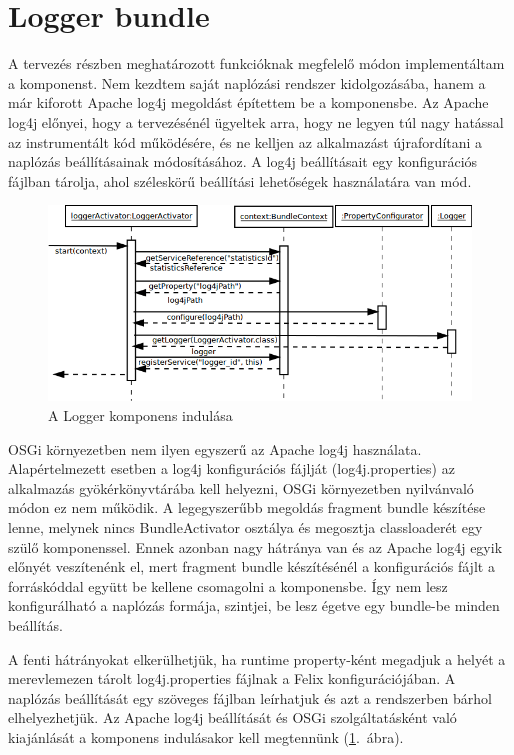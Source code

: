 
\section{Logger bundle}
\label{sec:loggerbundle}

A tervezés részben meghatározott funkcióknak megfelelő módon implementáltam a komponenst. Nem kezdtem saját naplózási rendszer kidolgozásába, hanem a már kiforott Apache log4j megoldást építettem be a komponensbe. Az Apache log4j előnyei, hogy a tervezésénél ügyeltek arra, hogy ne legyen túl nagy hatással az instrumentált kód működésére, és ne kelljen az alkalmazást újrafordítani a naplózás beállításainak módosításához. A log4j beállításait egy konfigurációs fájlban tárolja, ahol széleskörű beállítási lehetőségek használatára van mód.

\begin{figure}[htp]
\centering
\includegraphics[scale=0.5]{img/sequence_logger}
\caption{A Logger komponens indulása}
\label{fig:sequence_logger}
\end{figure}

OSGi környezetben nem ilyen egyszerű az Apache log4j használata. Alapértelmezett esetben a log4j konfigurációs fájlját (log4j.properties) az alkalmazás gyökérkönyvtárába kell helyezni, OSGi környezetben nyilvánvaló módon ez nem működik. A legegyszerűbb megoldás fragment bundle készítése lenne, melynek nincs BundleActivator osztálya és megosztja classloaderét egy szülő komponenssel. Ennek azonban nagy hátránya van és az Apache log4j egyik előnyét veszítenénk el, mert fragment bundle készítésénél a konfigurációs fájlt a forráskóddal együtt be kellene csomagolni a komponensbe. Így nem lesz konfigurálható a naplózás formája, szintjei, be lesz égetve egy bundle-be minden beállítás.

A fenti hátrányokat elkerülhetjük, ha runtime property-ként megadjuk a helyét a merevlemezen tárolt log4j.properties fájlnak a Felix konfigurációjában. A naplózás beállítását egy szöveges fájlban leírhatjuk és azt a rendszerben bárhol elhelyezhetjük. Az Apache log4j beállítását és OSGi szolgáltatásként való kiajánlását a komponens indulásakor kell megtennünk (\ref{fig:sequence_logger}.~ábra).

